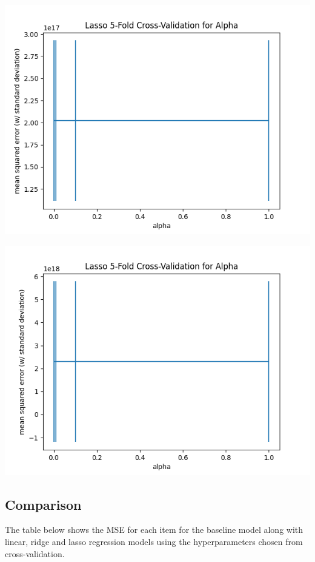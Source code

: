 \documentclass[10pt]{article}
\begin{document}
\begin{minipage}[t]{0.8\linewidth}
			\begin{minipage}{0.35\linewidth}
				\includegraphics[width=\linewidth]{../graphs/afterburner_lasso_alpha_crossval.png}
			\end{minipage}\quad%
			\begin{minipage}{0.35\linewidth}
				\includegraphics[width=\linewidth]{../graphs/entropic_radiation_sink_lasso_alpha_crossval.png}
			\end{minipage}
		\end{minipage}
	
	\subsection{Comparison}
		The table below shows the MSE for each item for the baseline model along with linear, ridge and lasso regression models using the hyperparameters chosen from cross-validation. 
		
\end{document}
